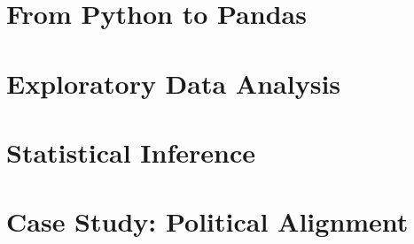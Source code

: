\documentclass{book}
\begin{document}

\frontmatter





\mainmatter


\part{From Python to Pandas}














\part{Exploratory Data Analysis}










\part{Statistical Inference}








\part{Case Study: Political Alignment}
















\end{document}

